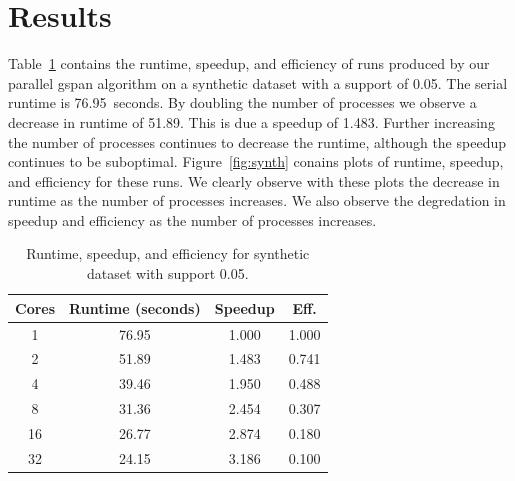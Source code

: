 \section{Results}
\label{sec:results}

Table~\ref{tab:synth} contains the runtime, speedup, and efficiency of runs
produced by our parallel gspan algorithm on a synthetic dataset with
a support of 0.05. The serial runtime is 76.95~seconds. By doubling
the number of processes we observe a decrease in runtime of 51.89. This
is due a speedup of 1.483. Further increasing the number of processes continues
to decrease the runtime, although the speedup continues to be suboptimal.
Figure~\ref{fig:synth} conains plots of runtime, speedup, and efficiency for
these runs. We clearly observe with these plots the decrease in runtime as the
number of processes increases. We also observe the degredation in speedup and
efficiency as the number of processes increases.


\begin{table}
\centering
\begin{tabular}{cccc}
\hline
Cores & Runtime (seconds) & Speedup &  Eff.  \\
\hline
1    &   76.95   &  1.000 &     1.000  \\
2    &   51.89   &  1.483 &     0.741  \\
4    &   39.46   &  1.950 &     0.488  \\
8    &   31.36   &  2.454 &     0.307  \\
16   &   26.77   &  2.874 &     0.180  \\
32   &   24.15   &  3.186 &     0.100  \\
\hline
\end{tabular}
\caption{Runtime, speedup, and efficiency for synthetic dataset with support
         0.05.}
\label{tab:synth}
\end{table}

